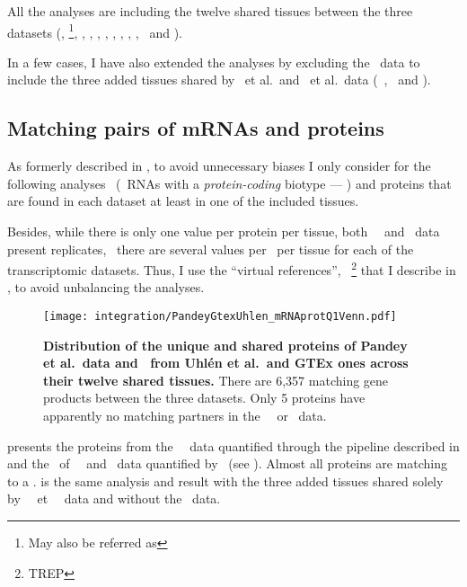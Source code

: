 All the analyses are including the twelve shared tissues between the three
datasets (\adrenal, \Bladder{}\footnote{May also
be referred as },
\hColon, \Oesophagus, \Heart,
\Kidney, \Liver, \Lung, \Ovary, \Pancreas,
\Prostate\ and \Testis).

\vspace{-1.5mm}
In a few cases, I have also extended the analyses by excluding the \gtex\ data
to include the three added tissues shared by
\pandey\ et al.\ and \uhlen\ et al.\ data (\ie\ \Gall, \Placenta\ and \Rectum).

\vspace{-2mm}
\subsection{Matching pairs of mRNAs and proteins}

\vspace{-3mm}
As formerly described in ,
to avoid unnecessary biases I only consider for the following analyses
\mRNAs\ (\ie\ \glspl{RNA} with a \emph{protein-coding} biotype --- )
and proteins that are found in each dataset at least in one of the included tissues.

Besides, while there is only one value per protein per tissue,
both \uhlen\ \etal\ and \gtex\ data present replicates,
\ie\ there are several values per \mRNA\ per tissue
for each of the transcriptomic datasets.
Thus, I use the \enquote{virtual references},
\ie\ \treps\footnote{\glsdesc{TREP}}
that I describe in ,
to avoid unbalancing the analyses.

\begin{figure}[!htpb]
    \texttt{[image: integration/PandeyGtexUhlen\_mRNAprotQ1Venn.pdf]}\centering
    \vspace{-5mm}
    \caption[Distribution of the unique and shared proteins/mRNAs for the three datasets
    across twelve tissues]{%
    \label{fig:PGU_vennQ1}\textbf{Distribution of the unique and shared proteins
    of Pandey et al.\ data and \mRNAs\ from Uhlén et al.\ and GTEx ones across
    their twelve shared tissues.}
    There are 6,357 matching gene products between the three datasets.
    Only 5 proteins have apparently no matching partners
    in the \uhlen\ \etal\ or \gtex\ data.}
\end{figure}

 presents the proteins from the \pandey\ \etal\ data
quantified through the pipeline described in 
and the \mRNAs\ of \uhlen\ \etal\ and \gtex\ data quantified by \htseq\
(see ).
Almost all proteins are matching to a \mRNA{}.
 is the same analysis and result
with the three added tissues shared solely by \pandey\ \etal\ et \uhlen\ \etal\ data
and without the \gtex\ data.

